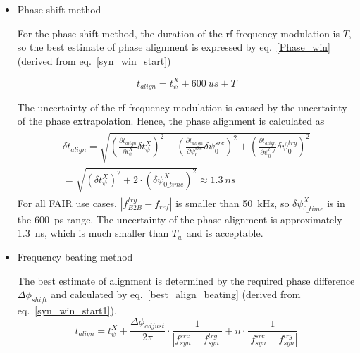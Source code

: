 \begin{itemize}
\item Phase shift method

For the phase shift method, the duration of the rf frequency modulation is $T$, so the best estimate of phase alignment is expressed by  eq.~\ref{Phase_win} (derived from eq.~\ref{syn_win_start})

\begin{equation}
t_\mathit{align} = t_{\psi}^X + \SI{600}{us}+T \label{Phase_win}
\end{equation}

The uncertainty of the rf frequency modulation is caused by the uncertainty of the phase extrapolation. Hence, the phase alignment is calculated as
\begin{eqnarray}
\begin{aligned}
\delta t_\mathit{align} = \sqrt {(\frac {\partial t_\mathit{align}}{\partial t_\psi^\mathit{X}} \delta t_\psi^\mathit{X})^2 +(\frac {\partial t_\mathit{align}}{\partial \psi^\mathit{src}_0} \delta\psi^\mathit{src}_0)^2+(\frac {\partial t_\mathit{align}}{\partial \psi^\mathit{trg}_0} \delta\psi^\mathit{trg}_0)^2  }\\
=\sqrt {(\delta t_{\psi}^X)^2 + 2\cdot(\delta \psi^{X}_\mathit{0\_time})^2 }\approx \SI{1.3}{ns}
\end{aligned}
\end{eqnarray}
For all FAIR use cases, $|f_\mathit{B2B}^\mathit{trg}-f_\mathit{ref}|$ is smaller than \SI{50}{kHz}, so $\delta \psi^{X}_\mathit{0\_time}$ is in the \SI{600}{ps} range. The uncertainty of the phase alignment is approximately \SI{1.3}{ns}, which is much smaller than $T_\mathit{w}$ and is acceptable.

\item Frequency beating method

The best estimate of alignment is determined by the required phase difference $\Delta \phi_\mathit{shift}$ and calculated by eq.~\ref{best_align_beating} (derived from eq.~\ref{syn_win_start1}).
\begin{equation}
t_\mathit{align}= t_\psi^\mathit{X}+\frac{\Delta \phi_\mathit{adjust}}{2\pi}\cdot\frac{1}{|f_{\mathit{syn}}^\mathit{src}-f_{\mathit{syn}}^\mathit{trg}|}+ n\cdot \frac{1}{|f_{\mathit{syn}}^\mathit{src}-f_{\mathit{syn}}^\mathit{trg}|}
\label{best_align_beating}
\end{equation}


\end{itemize}
